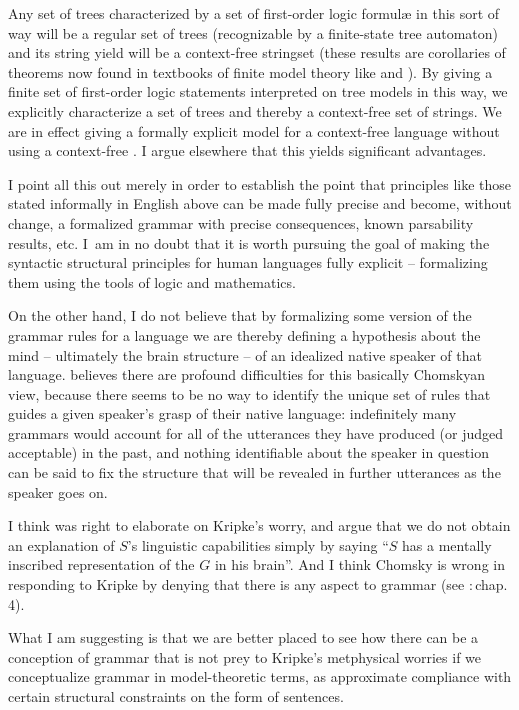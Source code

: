\documentclass[output=paper]{langscibook}
\begin{document}
Any set of trees characterized by a set of first-order logic formul{\ae} in this sort of way will be a regular set of trees (recognizable by a finite-state tree automaton) and its string yield will be a context-free stringset (these results are corollaries of theorems now found in textbooks of finite model theory like \citealt{EbbiFlum99} and \citealt{Libkin04}). By giving a finite set of first-order logic statements interpreted on tree models in this way, we explicitly characterize a set of trees and thereby a context-free set of strings.  We are in effect giving a formally explicit model for a context-free language without using a context-free .  I argue elsewhere \citep{Pullum13} that this yields significant advantages.

I point all this out merely in order to establish the point that  principles like those stated informally in English above can be made fully precise and become, without change, a formalized grammar with precise consequences, known parsability results, etc. I~am in no doubt that it is worth pursuing the goal of making the syntactic structural principles for human languages fully explicit -- formalizing them using the tools of logic and mathematics.

On the other hand, I do not believe that by formalizing some version of the grammar rules for a language we are thereby defining a hypothesis about the mind -- ultimately the brain structure -- of an idealized native speaker of that language. \citet{Kripke82} believes there are profound difficulties for this basically Chomskyan view, because there seems to be no way to identify the unique set of rules that guides a given speaker's grasp of their native language: indefinitely many grammars would account for all of the utterances they have produced (or judged acceptable) in the past, and nothing identifiable about the speaker in question can be said to fix the structure that will be revealed in further utterances as the speaker goes on.

I think \citet{Scholz90} was right to elaborate on Kripke's worry, and argue that we do not obtain an explanation of $S$'s linguistic capabilities simply by saying ``$S$ has a mentally inscribed representation of the  $G$ in his brain''. And I think Chomsky is wrong in responding to Kripke by denying that there is any  aspect to grammar (see \citealt{Chomsky86KL}:\,chap. 4).

What I am suggesting is that we are better placed to see how there can be a  conception of grammar that is not prey to Kripke's metphysical worries if we conceptualize grammar in model-theoretic terms, as approximate compliance with certain structural constraints on the form of sentences.
\end{document}
